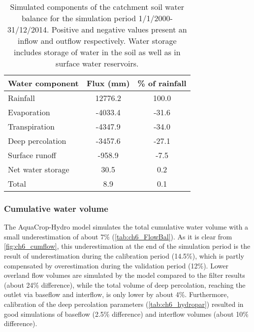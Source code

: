 \begin{table}[htbp]
  \centering
  	\caption{Simulated components of the catchment soil water balance for the simulation period 1/1/2000-31/12/2014. Positive and negative values present an inflow and outflow respectively. Water storage includes storage of water in the soil as well as in surface water reservoirs.}
\begin{tabular}{lcc}
\toprule
\textbf{Water component} & \textbf{Flux (mm)} & \textbf{\% of rainfall} \\
\midrule
Rainfall & 12776.2 & 100.0 \\
Evaporation & -4033.4 & -31.6 \\
Transpiration  & -4347.9 & -34.0 \\
Deep percolation  & -3457.6 & -27.1 \\
Surface runoff  & -958.9 & -7.5 \\
Net water storage  & 30.5  & 0.2 \\
\midrule
Total & 8.9   & 0.1 \\
\bottomrule
\end{tabular}%
  \label{tab:ch6_Wabal}%
  \end{table}

\subsubsection{Cumulative water volume}
The AquaCrop-Hydro model simulates the total cumulative water volume with a small underestimation of about 7\% (\autoref{tab:ch6_FlowBal}). As it is clear from \autoref{fig:ch6_cumflow}, this underestimation at the end of the simulation period is the result of underestimation during the calibration period (14.5\%), which is partly compensated by overestimation during the validation period (12\%). Lower overland flow volumes are simulated by the model compared to the filter results (about 24\% difference), while the total volume of deep percolation, reaching the outlet via baseflow and interflow, is only lower by about 4\%. Furthermore, calibration of the deep percolation parameters (\autoref{tab:ch6_hydropar}) resulted in good simulations of baseflow (2.5\% difference) and interflow volumes (about 10\% difference). 

